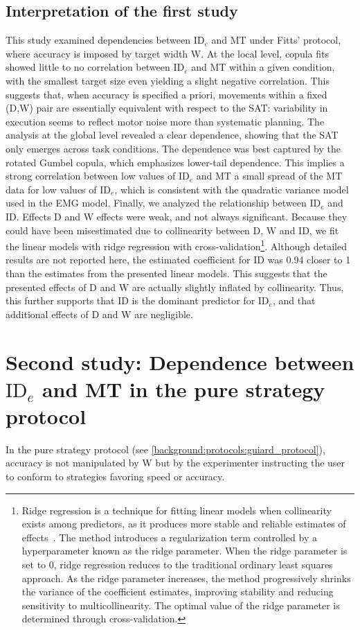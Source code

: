 \documentclass[acmlarge, manuscript,review]{acmart}
\newcommand{\ide}{\ensuremath{{\text{ID}_e}}\xspace}
\begin{document}
\subsection{Interpretation of the first study \label{study_one:interpretation}}
This study examined dependencies between \ide and MT under Fitts' protocol, where accuracy is imposed by target width W. At the local level, copula fits showed little to no correlation between \ide and MT within a given condition, with the smallest target size even yielding a slight negative correlation. This suggests that, when accuracy is specified a priori, movements within a fixed (D,W) pair are essentially equivalent with respect to the SAT: variability in execution seems to reflect motor noise more than systematic planning.
The analysis at the global level revealed a clear dependence, showing that the SAT only emerges across task conditions. The dependence was best captured by the rotated Gumbel copula, which emphasizes lower-tail dependence. This implies a strong correlation between low values of \ide and MT \ie a small spread of the MT data for low values of \ide, which is consistent with the quadratic variance model used in the EMG model.
Finally, we analyzed the relationship between \ide and ID. Effects D and W effects were weak, and not always significant. Because they could have been misestimated due to collinearity between D, W and ID, we fit the linear models with ridge regression with cross-validation\footnote{Ridge regression is a technique for fitting linear models when collinearity exists among predictors, as it produces more stable and reliable estimates of effects~\cite{gruber2017}. The method introduces a regularization term controlled by a hyperparameter known as the ridge parameter. When the ridge parameter is set to 0, ridge regression reduces to the traditional ordinary least squares approach. As the ridge parameter increases, the method progressively shrinks the variance of the coefficient estimates, improving stability and reducing sensitivity to multicollinearity. The optimal value of the ridge parameter is determined through cross-validation.}. Although detailed results are not reported here, the estimated coefficient for ID was 0.94 \ie closer to 1 than the estimates from the presented linear models. This suggests that the presented effects of D and W are actually slightly inflated by collinearity. Thus, this further supports that ID is the dominant predictor for \ide, and that additional effects of D and W are negligible.


\section{Second study: Dependence between \ide and MT in the pure strategy protocol \label{sec:gop}}
In the pure strategy protocol (see \autoref{background:protocols:guiard_protocol}), accuracy is not manipulated by W but by the experimenter instructing the user to conform to strategies favoring speed or accuracy. 
\end{document}
